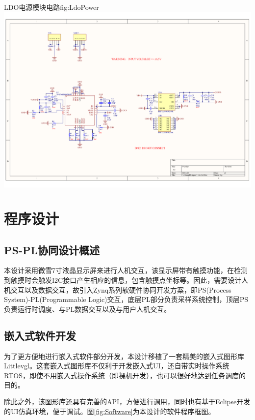 \documentclass[supercite]{HustGraduPaper}
\begin{document}
	\begin{generalfig}[htb]{LDO电源模块电路}{fig:LdoPower}
		\includegraphics[width=14cm]{Figures/LdoPower.pdf}
	\end{generalfig}
	
	
	\section{程序设计}
	\subsection{PS-PL协同设计概述}
	本设计采用微雪7寸液晶显示屏来进行人机交互，该显示屏带有触摸功能，在检测到触摸时会触发I2C接口产生相应的信息，包含触摸点坐标等。因此，需要设计人机交互以及数据交互，故引入Zynq系列软硬件协同开发方案，即PS(Process System)-PL(Programmable Logic)交互，底层PL部分负责采样系统控制，顶层PS负责运行时调度、与PL数据交互以及与用户人机交互。
	
	\subsection{嵌入式软件开发}
	
	为了更方便地进行嵌入式软件部分开发，本设计移植了一套精美的嵌入式图形库Littlevgl。这套嵌入式图形库不仅利于开发嵌入式UI，还自带实时操作系统RTOS，即使不用嵌入式操作系统（即裸机开发），也可以很好地达到任务调度的目的。
	
	除此之外，该图形库还具有完善的API，方便进行调用，同时也有基于Eclipse开发的UI仿真环境，便于调试。图\autoref{fig:Software}为本设计的软件程序框图。
	
\end{document}
